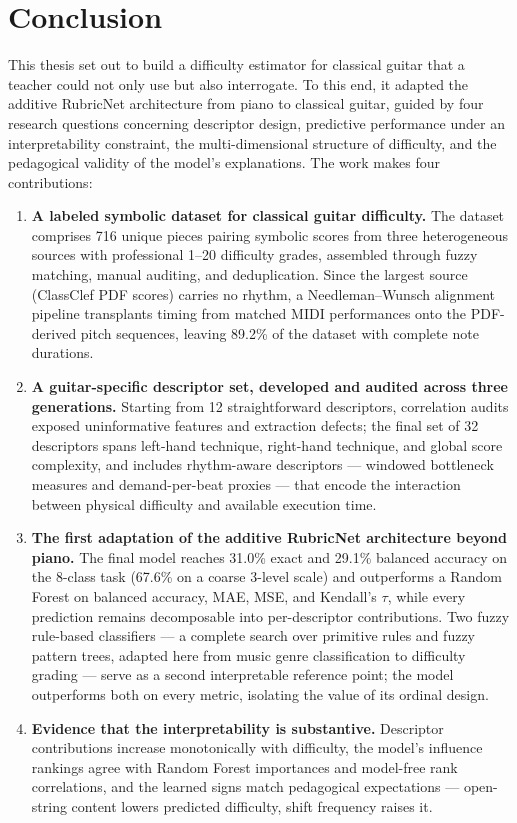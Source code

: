 \chapter{Conclusion}
\label{ch:conclusion}

This thesis set out to build a difficulty estimator for classical guitar that a teacher could not only use but also interrogate. To this end, it adapted the additive RubricNet architecture from piano to classical guitar, guided by four research questions concerning descriptor design, predictive performance under an interpretability constraint, the multi-dimensional structure of difficulty, and the pedagogical validity of the model's explanations. The work makes four contributions:

\begin{enumerate}
    \item \textbf{A labeled symbolic dataset for classical guitar difficulty.} The dataset comprises 716 unique pieces pairing symbolic scores from three heterogeneous sources with professional 1--20 difficulty grades, assembled through fuzzy matching, manual auditing, and deduplication. Since the largest source (ClassClef PDF scores) carries no rhythm, a Needleman--Wunsch alignment pipeline transplants timing from matched MIDI performances onto the PDF-derived pitch sequences, leaving 89.2\% of the dataset with complete note durations.
    \item \textbf{A guitar-specific descriptor set, developed and audited across three generations.} Starting from 12 straightforward descriptors, correlation audits exposed uninformative features and extraction defects; the final set of 32 descriptors spans left-hand technique, right-hand technique, and global score complexity, and includes rhythm-aware descriptors --- windowed bottleneck measures and demand-per-beat proxies --- that encode the interaction between physical difficulty and available execution time.
    \item \textbf{The first adaptation of the additive RubricNet architecture beyond piano.} The final model reaches 31.0\% exact and 29.1\% balanced accuracy on the 8-class task (67.6\% on a coarse 3-level scale) and outperforms a Random Forest on balanced accuracy, MAE, MSE, and Kendall's $\tau$, while every prediction remains decomposable into per-descriptor contributions. Two fuzzy rule-based classifiers --- a complete search over primitive rules and fuzzy pattern trees, adapted here from music genre classification to difficulty grading --- serve as a second interpretable reference point; the model outperforms both on every metric, isolating the value of its ordinal design.
    \item \textbf{Evidence that the interpretability is substantive.} Descriptor contributions increase monotonically with difficulty, the model's influence rankings agree with Random Forest importances and model-free rank correlations, and the learned signs match pedagogical expectations --- open-string content lowers predicted difficulty, shift frequency raises it.
\end{enumerate}

